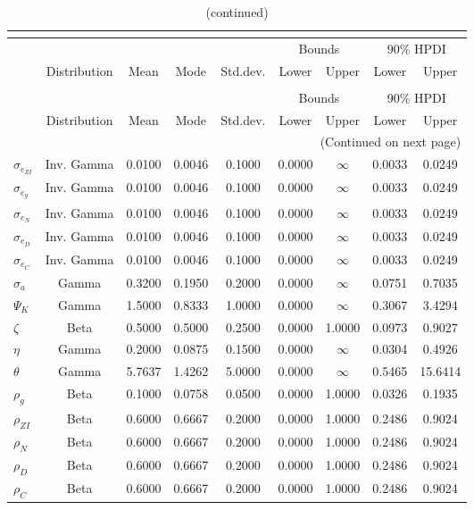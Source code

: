  
\begin{center}
\begin{longtable}{lcccccccc} 
\caption{Prior information (parameters)}\\
 \label{Table:Prior}\\
\toprule%
  &  &  &  &  & \multicolumn{2}{c}{Bounds} & \multicolumn{2}{c}{90\% HPDI} \\ 
  \cmidrule(r{.75em}){6-7} \cmidrule(r{.75em}){8-9}
  & Distribution & Mean & Mode & Std.dev. & Lower & Upper & Lower & Upper  \\ 
\midrule
\endfirsthead
\caption{(continued)}\\
 \toprule%
  &  &  &  &  & \multicolumn{2}{c}{Bounds} & \multicolumn{2}{c}{90\% HPDI} \\ 
  \cmidrule(r{.75em}){6-7} \cmidrule(r{.75em}){8-9}
  & Distribution & Mean & Mode & Std.dev. & Lower & Upper & Lower & Upper  \\ 
\midrule
\endhead
\midrule
\multicolumn{9}{r}{(Continued on next page)} \\ 
\bottomrule
\endfoot
\bottomrule
\endlastfoot
$ \sigma_{{e_{ZI}}} $ & Inv. Gamma & 0.0100 & 0.0046 & 0.1000 & 0.0000 & $\infty$ & 0.0033 & 0.0249 \\ 
$ \sigma_{{e_g}} $ & Inv. Gamma & 0.0100 & 0.0046 & 0.1000 & 0.0000 & $\infty$ & 0.0033 & 0.0249 \\ 
$ \sigma_{{e_N}} $ & Inv. Gamma & 0.0100 & 0.0046 & 0.1000 & 0.0000 & $\infty$ & 0.0033 & 0.0249 \\ 
$ \sigma_{{e_D}} $ & Inv. Gamma & 0.0100 & 0.0046 & 0.1000 & 0.0000 & $\infty$ & 0.0033 & 0.0249 \\ 
$ \sigma_{{e_C}} $ & Inv. Gamma & 0.0100 & 0.0046 & 0.1000 & 0.0000 & $\infty$ & 0.0033 & 0.0249 \\ 
$ {\sigma_a} $ & Gamma & 0.3200 & 0.1950 & 0.2000 & 0.0000 & $\infty$ & 0.0751 & 0.7035 \\ 
$ {\Psi_K} $ & Gamma & 1.5000 & 0.8333 & 1.0000 & 0.0000 & $\infty$ & 0.3067 & 3.4294 \\ 
$ {\zeta} $ & Beta & 0.5000 & 0.5000 & 0.2500 & 0.0000 & 1.0000 & 0.0973 & 0.9027 \\ 
$ {\eta} $ & Gamma & 0.2000 & 0.0875 & 0.1500 & 0.0000 & $\infty$ & 0.0304 & 0.4926 \\ 
$ {\theta} $ & Gamma & 5.7637 & 1.4262 & 5.0000 & 0.0000 & $\infty$ & 0.5465 & 15.6414 \\ 
$ {\rho_g} $ & Beta & 0.1000 & 0.0758 & 0.0500 & 0.0000 & 1.0000 & 0.0326 & 0.1935 \\ 
$ {\rho_{ZI}} $ & Beta & 0.6000 & 0.6667 & 0.2000 & 0.0000 & 1.0000 & 0.2486 & 0.9024 \\ 
$ {\rho_N} $ & Beta & 0.6000 & 0.6667 & 0.2000 & 0.0000 & 1.0000 & 0.2486 & 0.9024 \\ 
$ {\rho_D} $ & Beta & 0.6000 & 0.6667 & 0.2000 & 0.0000 & 1.0000 & 0.2486 & 0.9024 \\ 
$ {\rho_C} $ & Beta & 0.6000 & 0.6667 & 0.2000 & 0.0000 & 1.0000 & 0.2486 & 0.9024 \\ 
\end{longtable}
 \end{center}
